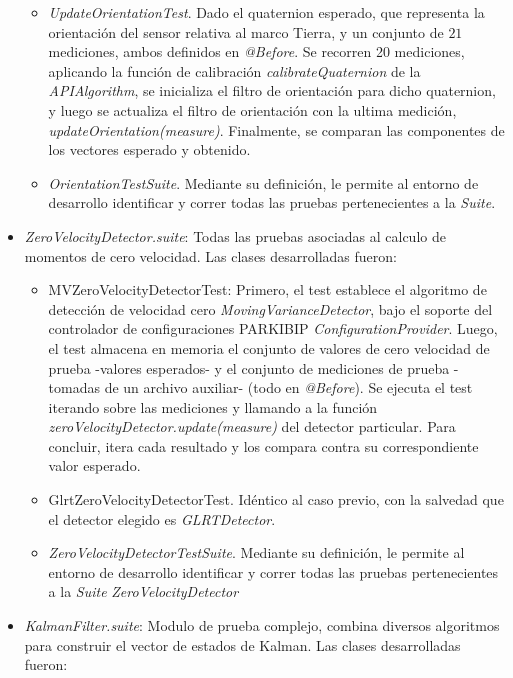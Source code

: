 \begin{itemize}
    \begin{itemize}
        \item \textit{UpdateOrientationTest}. Dado el quaternion esperado, que representa la orientación del sensor relativa al marco Tierra, y un conjunto de $21$ mediciones, ambos definidos en \textit{@Before}. Se recorren 20 mediciones, aplicando la función de calibración \textit{calibrateQuaternion} de la \textit{APIAlgorithm}, se inicializa el filtro de orientación para dicho quaternion, y luego se actualiza el filtro de orientación con la ultima medición, \textit{updateOrientation(measure)}. Finalmente, se comparan las componentes de los vectores esperado y obtenido.
        \item \textit{OrientationTestSuite}. Mediante su definición, le permite al entorno de desarrollo identificar y correr todas las pruebas pertenecientes a la \textit{Suite}.
    \end{itemize}
    \item \textit{ZeroVelocityDetector.suite}: Todas las pruebas asociadas al calculo de momentos de cero velocidad. Las clases desarrolladas fueron:
    \begin{itemize}
        \item MVZeroVelocityDetectorTest: Primero, el test establece  el algoritmo de detección de velocidad cero \textit{MovingVarianceDetector}, bajo el soporte del controlador de configuraciones PARKIBIP \textit{ConfigurationProvider}. Luego, el test almacena en memoria el conjunto de valores de cero velocidad de prueba -valores esperados- y el conjunto de mediciones de prueba - tomadas de un archivo auxiliar- (todo en \textit{@Before}). Se ejecuta el test iterando sobre las mediciones y llamando a la función \textit{zeroVelocityDetector.update(measure)} del detector particular. Para concluir, itera cada resultado y los compara contra su correspondiente valor esperado.
        \item GlrtZeroVelocityDetectorTest. Idéntico al caso previo, con la salvedad que el detector elegido es \textit{GLRTDetector}.
        \item \textit{ZeroVelocityDetectorTestSuite}. Mediante su definición, le permite al entorno de desarrollo identificar y correr todas las pruebas pertenecientes a la \textit{Suite} \textit{ZeroVelocityDetector}
    \end{itemize}
    \item \textit{KalmanFilter.suite}: Modulo de prueba complejo, combina diversos algoritmos para construir el vector de estados de Kalman. Las clases desarrolladas fueron:

\end{itemize}
